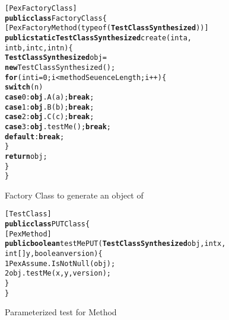 \begin{figure}[t]
\begin{CodeOut}
\begin{alltt}
  [PexFactoryClass]
  \textbf{public class} FactoryClass\{
  \hspace{0.5cm}[PexFactoryMethod(typeof(\textbf{TestClassSynthesized}))]
  \hspace{0.5cm}\textbf{public static TestClassSynthesized} create(int a, 
  \hspace{1.5cm}int b, int c, int n)\{
  \hspace{1.0cm}\textbf{TestClassSynthesized} obj = 
  \hspace{1.5cm}\textbf{new} TestClassSynthesized(); 
  \hspace{1.0cm} \textbf{for}(int i=0; i< methodSeuenceLength; i++)\{
  \hspace{1.5cm} \textbf{switch}(n)
  \hspace{2.0cm} \textbf{case} 0: \textbf{obj}.A(a);\textbf{break};
  \hspace{2.0cm} \textbf{case} 1: \textbf{obj}.B(b);\textbf{break};
  \hspace{2.0cm} \textbf{case} 2: \textbf{obj}.C(c);\textbf{break};
  \hspace{2.0cm} \textbf{case} 3: \textbf{obj}.testMe();\textbf{break};
  \hspace{2.0cm} \textbf{default}: \textbf{break};
  \hspace{1.0cm}\}
  \hspace{1.5cm} \textbf{return} obj;
  \hspace{0.5cm}\}
  \}
\end{alltt}
\end{CodeOut}
\vspace{-0.15 in}
\caption{Factory Class to generate an object of }
\label{fig:factory}
\end{figure}

\begin{figure}[t]
\begin{CodeOut}
\begin{alltt}
  [TestClass]
  \textbf{public class} PUTClass\{
  \hspace{0.5cm}[PexMethod]
  \hspace{0.5cm}\textbf{public boolean} testMePUT(\textbf{TestClassSynthesized} obj, int x, 
  \hspace{1.5cm}int[] y, boolean version)\{
 1\hspace{1.0cm}PexAssume.IsNotNull(obj);
 2\hspace{1.0cm}obj.testMe(x, y, version);
  \hspace{0.5cm}\}
  \}
\end{alltt}
\end{CodeOut}
\vspace{-0.15 in}
\caption{Parameterized test for Method }
\label{fig:PUT}
\end{figure}
	
